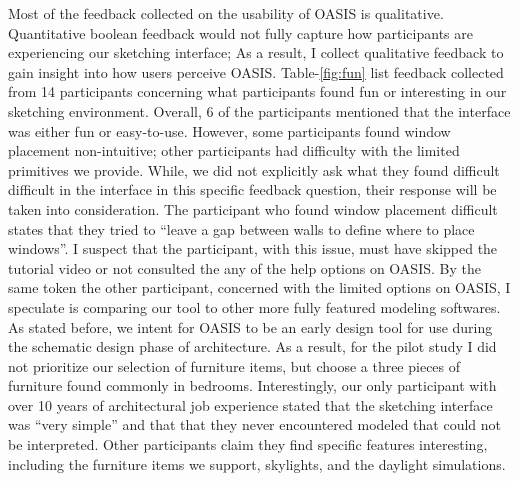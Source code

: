Most of the feedback collected on the usability of OASIS is qualitative.
Quantitative boolean feedback would not fully capture how participants are experiencing our sketching interface;
As a result, I collect qualitative feedback to gain insight into how users perceive OASIS.
Table-\ref{fig:fun} list feedback collected from 14 participants concerning what participants found fun or interesting in our sketching environment.
Overall, 6 of the participants mentioned that the interface was either fun or easy-to-use.
However, some participants found window placement non-intuitive; 
other participants had difficulty with the limited primitives we provide.
While, we did not explicitly ask what they found difficult difficult in the interface in this specific feedback question, their response will be taken into consideration.
The participant who found window placement difficult states that they tried to ``leave a gap between walls to define where to place windows''.
I suspect that the participant, with this issue, must have skipped the tutorial video or not consulted the any of the help options on OASIS.
By the same token the other participant, concerned with the limited options on OASIS, I speculate is comparing our tool to other more fully featured modeling softwares.
As stated before, we intent for OASIS to be an early design tool for use during the schematic design phase of architecture.
As a result, for the pilot study I did not prioritize our selection of furniture items, but choose a three pieces of furniture found commonly in bedrooms.
Interestingly, our only participant with over 10 years of architectural job experience stated that the sketching interface was ``very simple'' and that that they never encountered modeled that could not be interpreted.
Other participants claim they find specific features interesting, including the furniture items we support, skylights, and the daylight simulations.\\



